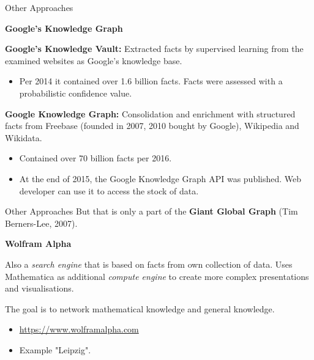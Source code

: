 \documentclass{beamer}
\newcommand{\ueberschrift}[1]{\begin{center}\bf #1\end{center}}
\begin{document}
\begin{frame}{Other Approaches}
\ueberschrift{Google's Knowledge Graph}

\textbf{Google's Knowledge Vault:} Extracted facts by supervised learning from
the examined websites as Google's knowledge base.
\begin{itemize}
\item Per 2014 it contained over 1.6 billion facts. Facts were assessed with a
  probabilistic confidence value.
\end{itemize}
\textbf{Google Knowledge Graph:} Consolidation and enrichment with structured
facts from Freebase (founded in 2007, 2010 bought by Google), Wikipedia and
Wikidata.
\begin{itemize}
\item Contained over 70 billion facts per 2016.
\item At the end of 2015, the Google Knowledge Graph API was published. Web
  developer can use it to access the stock of data.
\end{itemize}\vspace*{2em}
\end{frame}

\begin{frame}{Other Approaches}
But that is only a part of the \textbf{Giant Global Graph} (Tim Berners-Lee,
2007).
\ueberschrift{Wolfram Alpha}

Also a \emph{search engine} that is based on facts from own collection of
data.  Uses Mathematica as additional \emph{compute engine} to create more
complex presentations and visualisations.

The goal is to network mathematical knowledge and general knowledge.
\begin{itemize}
\item \url{https://www.wolframalpha.com}
\item Example "Leipzig".
\end{itemize}
\end{frame}
\end{document}
